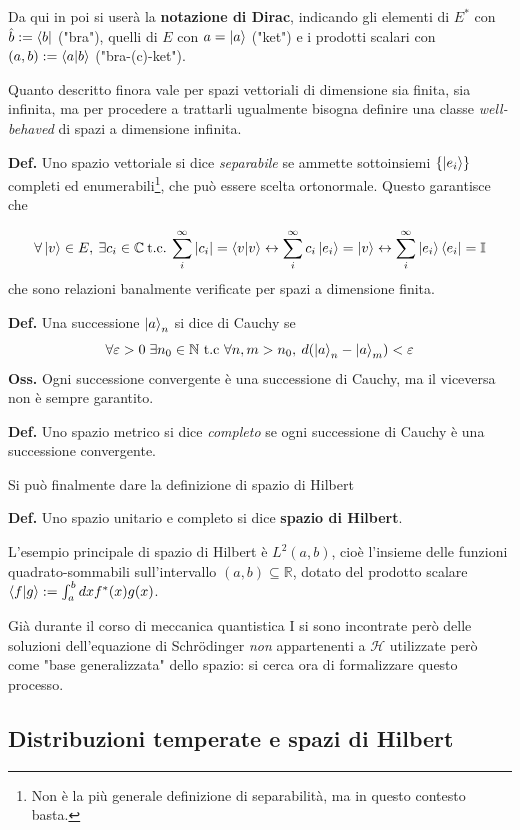 Da qui in poi si userà la \textbf{notazione di Dirac}, indicando gli elementi di
$ E^* $ con $ \hat{b} := \bra{b} $ ("bra"), quelli di $ E $ con $ a = \ket{a} $ ("ket") e
i prodotti scalari con $(a,b):=\bra{a}\ket{b}$ ("bra-(c)-ket").

Quanto descritto finora vale per spazi vettoriali di dimensione sia finita, sia infinita,
ma per procedere a trattarli ugualmente bisogna definire una classe \textit{well-behaved}
di spazi a dimensione infinita.

\textbf{Def.} Uno spazio vettoriale si dice \textit{separabile} se ammette sottoinsiemi 
$ \left\{ \ket{e_i}\right\}$ completi ed enumerabili\footnote{Non è la più generale
definizione di separabilità, ma in questo contesto basta.}, che può essere scelta
ortonormale.
Questo garantisce che

$$ \forall \ket{v}\in E,\: \exists c_i \in \mathbb{C} \:\text{t.c.}\:
\sum_{i}^{\infty} |c_i| = \bra{v}\ket{v} \leftrightarrow
\sum_{i}^{\infty}c_i\ket{e_i} = \ket{v} \leftrightarrow
\sum_{i}^{\infty}\ket{e_i}\bra{e_i} = \mathbb{I}
$$
che sono relazioni banalmente verificate per spazi a dimensione finita.

\textbf{Def.} Una successione $ \ket{a}_n $ si dice di Cauchy se
$$ \forall \varepsilon>0\;\exists n_0\in\mathbb{N} \text{ t.c } \forall n,m>n_0,\:
d(\ket{a}_n - \ket{a}_m)<\varepsilon$$
\textbf{Oss.} Ogni successione convergente è una successione di Cauchy, ma il viceversa
non è sempre garantito.

\textbf{Def.} Uno spazio metrico si dice \textit{completo} se ogni successione di Cauchy
è una successione convergente.

Si può finalmente dare la definizione di spazio di Hilbert

\textbf{Def.} Uno spazio unitario e completo si dice \textbf{spazio di Hilbert}.

L'esempio principale di spazio di Hilbert è $ L^2(a,b) $, cioè l'insieme delle funzioni
quadrato-sommabili sull'intervallo $ (a,b)\subseteq\mathbb{R} $, dotato del prodotto
scalare $ \bra{f}\ket{g} :=\int_{a}^{b}dxf^*(x)g(x) $.

Già durante il corso di meccanica quantistica I si sono incontrate però delle soluzioni
dell'equazione di Schrödinger \textit{non} appartenenti a $ \mathcal{H} $ utilizzate
però come "base generalizzata" dello spazio: si cerca ora di formalizzare questo
processo.

\subsection{Distribuzioni temperate e spazi di Hilbert}

